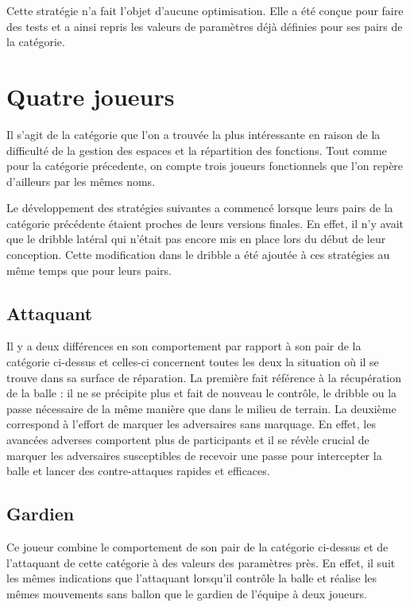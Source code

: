 \documentclass[12pt,a4paper]{article}
\begin{document}
Cette strat\'egie n'a fait l'objet d'aucune optimisation. Elle a \'et\'e 
con\c{c}ue pour faire des tests et a ainsi repris les valeurs de param\`etres 
d\'ej\`a d\'efinies pour ses pairs de la cat\'egorie. 

\section{Quatre joueurs}
Il s'agit de la cat\'egorie que l'on a trouv\'ee la plus int\'eressante en 
raison de la difficult\'e de la gestion des espaces et la r\'epartition des 
fonctions. Tout comme pour la cat\'egorie pr\'ecedente, on compte trois 
joueurs fonctionnels que l'on rep\`ere d'ailleurs par les m\^emes noms. 

Le d\'eveloppement des strat\'egies suivantes a commenc\'e lorsque leurs pairs 
de la cat\'egorie pr\'ec\'edente \'etaient proches de leurs versions finales. 
En effet, il n'y avait que le dribble lat\'eral qui n'\'etait pas encore mis en 
place lors du d\'ebut de leur conception. 
Cette modification dans le dribble a \'et\'e ajout\'ee \`a ces strat\'egies au 
m\^eme temps que pour leurs pairs.

\subsection*{Attaquant}
Il y a deux diff\'erences en son comportement par rapport \`a son pair 
de la cat\'egorie ci-dessus et celles-ci concernent toutes les deux la 
situation o\`u il se trouve dans sa surface de r\'eparation. La premi\`ere fait 
r\'ef\'erence \`a la r\'ecup\'eration de la balle : il ne se 
pr\'ecipite plus et fait de nouveau le contr\^ole, le dribble ou la passe 
n\'ecessaire de la m\^eme mani\`ere que dans le milieu de terrain. 
La deuxi\`eme correspond \`a l'effort de marquer les adversaires sans 
marquage. En effet, les avanc\'ees adverses comportent plus de participants et 
il se r\'ev\`ele crucial de marquer les adversaires susceptibles de 
recevoir une passe pour intercepter la balle et lancer des contre-attaques 
rapides et efficaces.

\subsection*{Gardien}
Ce joueur combine le comportement de son pair de la cat\'egorie ci-dessus et de 
l'attaquant de cette cat\'egorie \`a des valeurs des param\`etres pr\`es. En 
effet, il suit les m\^emes indications que l'attaquant lorsqu'il contr\^ole 
la balle et r\'ealise les m\^emes mouvements sans ballon que le gardien de 
l'\'equipe \`a deux joueurs.
\end{document}
